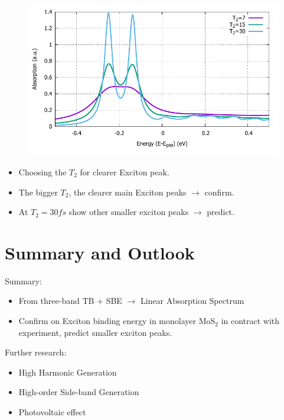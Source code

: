 \documentclass{beamer}
\begin{document}
\begin{frame}
		\begin{figure}
			\includegraphics[width=0.8\linewidth]{images/varyT2.pdf}
		\end{figure}
	
	\begin{itemize}
	\item Choosing the $T_2$ for clearer Exciton peak.
	\item The bigger $T_2$, the clearer main Exciton peaks $\to $ confirm.
	\item At $T_2 = 30 fs$ show other smaller exciton peaks $\to $ predict.
	\end{itemize}
\end{frame}
	\section{Summary and Outlook}
	\begin{frame}
		Summary:
		\begin{itemize}
	\item From three-band TB + SBE $\to $ Linear Absorption Spectrum
	\item Confirm on Exciton binding energy in monolayer $\mathrm{MoS}_2$ in contract with experiment, predict smaller exciton peaks.
		\end{itemize}
	Further research:
	\begin{itemize}
		\item High Harmonic Generation
		\item High-order Side-band Generation
		\item Photovoltaic effect
	\end{itemize}
	\end{frame}
	\begin{frame}
		
		
		
	\end{frame}
\end{document}
